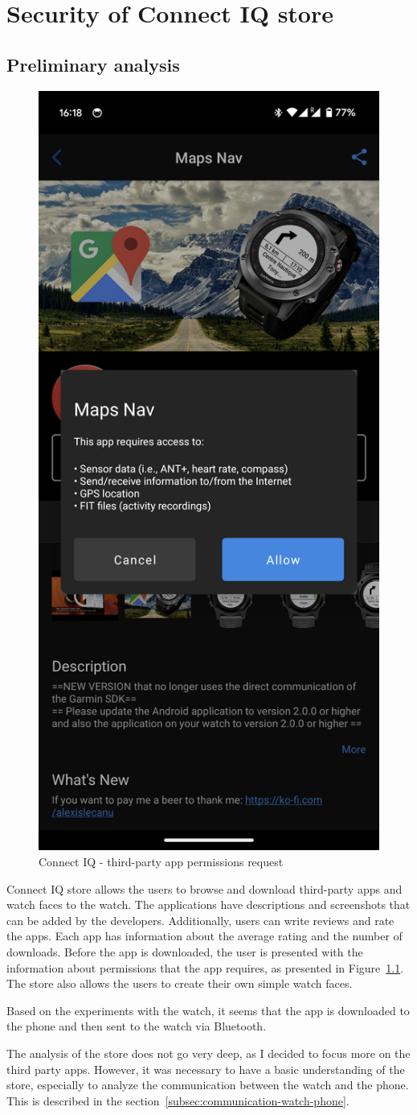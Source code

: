 \chapter{Security of Connect IQ store}
\section{Preliminary analysis}
\begin{figure}[h]
    \centering
    \includegraphics[width=0.3\linewidth]{../../images/connect-iq-app-permissions}
    \caption{Connect IQ - third-party app permissions request}
    \label{fig:connect-iq-store-permissions}
\end{figure}
Connect IQ store allows the users to browse and download third-party apps and watch faces to the watch.
The applications have descriptions and screenshots that can be added by the developers.
Additionally, users can write reviews and rate the apps.
Each app has information about the average rating and the number of downloads.
Before the app is downloaded, the user is presented with the information about permissions that the app requires, as presented in Figure~\ref{fig:connect-iq-store-permissions}.
The store also allows the users to create their own simple watch faces.

Based on the experiments with the watch, it seems that the app is downloaded to the phone and then sent to the watch via Bluetooth.

The analysis of the store does not go very deep, as I decided to focus more on the third party apps.
However, it was necessary to have a basic understanding of the store, especially to analyze the communication between the watch and the phone.
This is described in the section~\ref{subsec:communication-watch-phone}.

